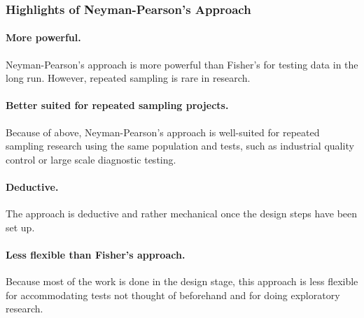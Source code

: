 \documentclass[
]{book}
\theoremstyle{definition}
\theoremstyle{definition}
\theoremstyle{definition}
\theoremstyle{definition}
\theoremstyle{remark}
\begin{document}
\hypertarget{highlights-of-neyman-pearsons-approach}{%
\subsubsection{Highlights of Neyman-Pearson's Approach}\label{highlights-of-neyman-pearsons-approach}}

\hypertarget{more-powerful.}{%
\paragraph*{More powerful.}\label{more-powerful.}}

Neyman-Pearson's approach is more powerful than Fisher's for testing data in the long run. However, repeated sampling is rare in research.

\hypertarget{better-suited-for-repeated-sampling-projects.}{%
\paragraph*{Better suited for repeated sampling projects.}\label{better-suited-for-repeated-sampling-projects.}}

Because of above, Neyman-Pearson's approach is well-suited for repeated sampling research using the same population and tests, such as industrial quality control or large scale diagnostic testing.

\hypertarget{deductive.}{%
\paragraph*{Deductive.}\label{deductive.}}

The approach is deductive and rather mechanical once the design steps have been set up.

\hypertarget{less-flexible-than-fishers-approach.}{%
\paragraph*{Less flexible than Fisher's approach.}\label{less-flexible-than-fishers-approach.}}

Because most of the work is done in the design stage, this approach is less flexible for accommodating tests not thought of beforehand and for doing exploratory research.
\end{document}
